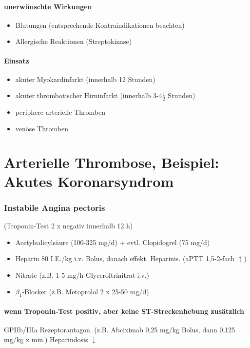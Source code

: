 \documentclass[10pt,a4paper]{report}
\begin{document}
\paragraph{unerwünschte Wirkungen} %
\label{par:unerw_nschte}
\begin{itemize}
	\item Blutungen (entsprechende Kontraindikationen beachten)
	\item Allergische Reaktionen (Streptokinase)
\end{itemize}
\paragraph{Einsatz} %
\label{par:einsatz}
\begin{itemize}
	\item akuter Myokardinfarkt (innerhalb 12 Stunden)
	\item akuter thrombotischer Hirninfarkt (innerhalb 3-4$\frac{1}{2}$ Stunden)
	\item periphere arterielle Thromben
	\item venöse Thromben
\end{itemize}
\section{Arterielle Thrombose, Beispiel: Akutes  Koronarsyndrom} %
\label{sec:arterielle_thrombose_beispiel_akutes_koronarsyndrom}
\subsubsection{Instabile Angina pectoris } %
\label{ssub:instabile_angina_pectoris_}
(Troponin-Test 2 x negativ innerhalb 12 h)
\begin{itemize}
	\item Acetylsalicylsäure (100-325 mg/d) + evtl. Clopidogrel (75 mg/d)
	\item Heparin 80 I.E./kg i.v. Bolus, danach effekt. Heparinis. (aPTT 1,5-2-fach $\uparrow$)
	\item Nitrate (z.B. 1-5 mg/h Glyceroltrinitrat i.v.)
	\item $\beta_1$-Blocker (z.B. Metoprolol 2 x 25-50 mg/d)
\end{itemize}
\paragraph{wenn Troponin-Test positiv, aber keine ST-Streckenhebung zusätzlich} %
\label{par:wenn_troponin_test_positiv_aber_keine_st_streckenhebung_zus_tzlich}
GPIIb/IIIa Rezeptorantagon. (z.B. Abciximab 0,25 mg/kg Bolus, dann 0,125 mg/kg x min.) Heparindosis $\downarrow$
\end{document}

